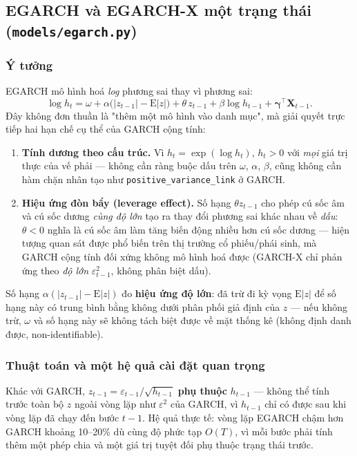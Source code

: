 \documentclass[11pt,a4paper]{article}
\newcommand{\code}[1]{\texttt{#1}}
\newcommand{\file}[1]{\texttt{#1}}
\begin{document}
\subsection{EGARCH và EGARCH-X một trạng thái (\file{models/egarch.py})}
\label{sec:egarch}

\subsubsection{Ý tưởng}

EGARCH mô hình hoá \emph{log} phương sai thay vì phương sai:
\begin{equation}
\log h_t = \omega + \alpha\big(|z_{t-1}| - \mathrm E|z|\big) + \theta\, z_{t-1} +
\beta \log h_{t-1} + \boldsymbol\gamma^\top \mathbf X_{t-1}.
\end{equation}
Đây không đơn thuần là "thêm một mô hình vào danh mục", mà giải quyết trực tiếp hai
hạn chế cụ thể của GARCH cộng tính:

\begin{enumerate}
  \item \textbf{Tính dương theo cấu trúc.} Vì $h_t = \exp(\log h_t)$, $h_t > 0$ với
    \emph{mọi} giá trị thực của vế phải --- không cần ràng buộc dấu trên $\omega$,
    $\alpha$, $\beta$, cũng không cần hàm chặn nhân tạo như
    \code{positive\_variance\_link} ở GARCH.
  \item \textbf{Hiệu ứng đòn bẩy (leverage effect).} Số hạng $\theta z_{t-1}$ cho phép
    cú sốc âm và cú sốc dương \emph{cùng độ lớn} tạo ra thay đổi phương sai khác
    nhau về \emph{dấu}: $\theta < 0$ nghĩa là cú sốc âm làm tăng biến động nhiều hơn
    cú sốc dương --- hiện tượng quan sát được phổ biến trên thị trường cổ phiếu/phái
    sinh, mà GARCH cộng tính đối xứng không mô hình hoá được (GARCH-X chỉ phản ứng
    theo \emph{độ lớn} $\varepsilon_{t-1}^2$, không phân biệt dấu).
\end{enumerate}

Số hạng $\alpha(|z_{t-1}| - \mathrm E|z|)$ đo \textbf{hiệu ứng độ lớn}: đã trừ đi kỳ
vọng $\mathrm E|z|$ để số hạng này có trung bình bằng không dưới phân phối giả định
của $z$ --- nếu không trừ, $\omega$ và số hạng này sẽ không tách biệt được về mặt
thống kê (không định danh được, non-identifiable).

\subsubsection{Thuật toán và một hệ quả cài đặt quan trọng}

Khác với GARCH, $z_{t-1} = \varepsilon_{t-1}/\sqrt{h_{t-1}}$ \textbf{phụ thuộc}
$h_{t-1}$ --- không thể tính trước toàn bộ $z$ ngoài vòng lặp như $\varepsilon^2$ của
GARCH, vì $h_{t-1}$ chỉ có được sau khi vòng lặp đã chạy đến bước $t-1$. Hệ quả thực
tế: vòng lặp EGARCH chậm hơn GARCH khoảng 10--20\% dù cùng độ phức tạp $O(T)$, vì mỗi
bước phải tính thêm một phép chia và một giá trị tuyệt đối phụ thuộc trạng thái trước.
\end{document}
